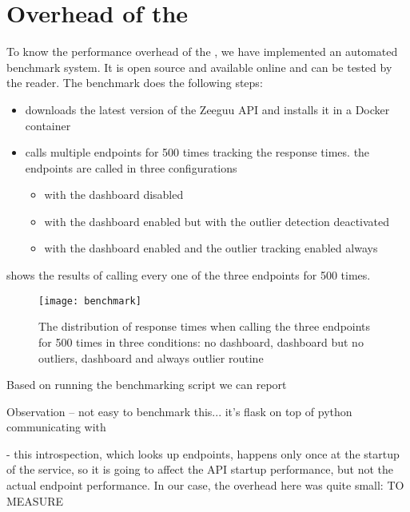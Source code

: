   

\section{Overhead of the \tool}
\label{sec:overhead}

To know the performance overhead of the \tool, we have implemented an automated benchmark system. It is open source and available online and can be tested by the reader. The benchmark does the following steps: 

\begin{itemize}
	\item downloads the latest version of the Zeeguu API and installs it in a Docker container
	\item calls multiple endpoints for 500 times tracking the response times. the endpoints are called in three configurations
	\begin{itemize}
		\item with the dashboard disabled
		\item with the dashboard enabled but with the outlier detection deactivated
		\item with the dashboard enabled and the outlier tracking enabled always
	\end{itemize}
\end{itemize}

 shows the results of calling every one of the three endpoints for 500 times. 


\begin{figure}[h!]
	\centering
	\texttt{[image: benchmark]}
	\caption{The distribution of response times when calling the three endpoints for 500 times in three conditions: no dashboard, dashboard but no outliers, dashboard and always outlier routine}
	\label{fig:bench}
\end{figure}

Based on running the benchmarking script we can report 

Observation -- not easy to benchmark this... it's flask on top of python communicating with 

- this introspection, which looks up endpoints, happens only once at the startup of the service, so it is going to affect the API startup performance, but not the actual endpoint performance. In our case, the overhead here was quite small: TO MEASURE


  